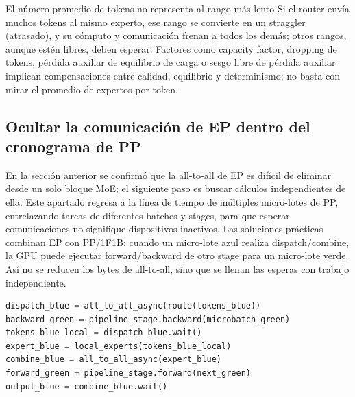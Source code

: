 

\begin{warningbox}{El número promedio de tokens no representa al rango más lento}
Si el router envía muchos tokens al mismo experto, ese rango se convierte en un straggler (atrasado), y su cómputo y comunicación frenan a todos los demás; otros rangos, aunque estén libres, deben esperar. Factores como capacity factor, dropping de tokens, pérdida auxiliar de equilibrio de carga o sesgo libre de pérdida auxiliar implican compensaciones entre calidad, equilibrio y determinismo; no basta con mirar el promedio de expertos por token.
\end{warningbox}

\subsection{Ocultar la comunicación de EP dentro del cronograma de PP}

En la sección anterior se confirmó que la all-to-all de EP es difícil de eliminar desde un solo bloque MoE; el siguiente paso es buscar cálculos independientes de ella. Este apartado regresa a la línea de tiempo de múltiples micro-lotes de PP, entrelazando tareas de diferentes batches y stages, para que esperar comunicaciones no signifique dispositivos inactivos. Las soluciones prácticas combinan EP con PP/1F1B: cuando un micro-lote azul realiza dispatch/combine, la GPU puede ejecutar forward/backward de otro stage para un micro-lote verde. Así no se reducen los bytes de all-to-all, sino que se llenan las esperas con trabajo independiente.


\begin{lstlisting}[language=Python,caption={Cronograma conceptual de superposición entre comunicación EP y cómputo de otro micro-lote}]
dispatch_blue = all_to_all_async(route(tokens_blue))
backward_green = pipeline_stage.backward(microbatch_green)
tokens_blue_local = dispatch_blue.wait()
expert_blue = local_experts(tokens_blue_local)
combine_blue = all_to_all_async(expert_blue)
forward_green = pipeline_stage.forward(next_green)
output_blue = combine_blue.wait()
\end{lstlisting}

